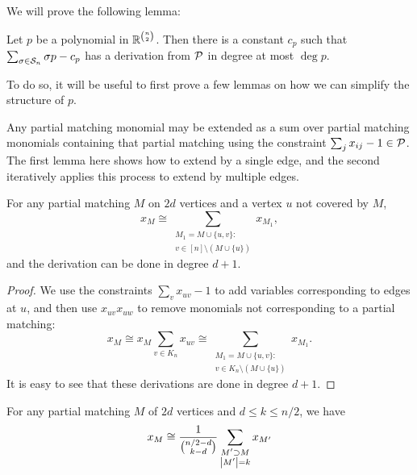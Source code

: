 We will prove the following lemma: 
\begin{lemma}
  \label{lem:constant}
  Let $p$ be a polynomial in $\mathbb R^{\binom{n}{2}}$.
	Then there is a constant $c_p$ such that $\sum_{\sigma \in \mathcal S_n} \sigma p - c_p$ has a derivation from $\mathcal P$ in degree at most $\deg p$. 
\end{lemma}
To do so, it will be useful to first prove a few lemmas on how we can simplify the structure of $p$. 

Any partial matching monomial may be extended as a sum over partial matching monomials containing that partial matching using the constraint $\sum_j x_{ij} - 1 \in \mathcal P$. The first lemma here shows how to extend by a single edge, and the second iteratively applies this process to extend by multiple edges.
\begin{lemma}
  \label{lem:matching+a}
  For any partial matching \(M\) on \(2d\) vertices
  and a vertex \(u\) not covered by \(M\),
  \begin{equation}
    \label{eq:matching+a}
    x_{M}
    \cong
    \sum_{\substack{M_{1} = M \cup \{u,v\}: \\
        v \in [n] \setminus (M \cup \{u\})}}
    x_{M_{1}}
    ,
  \end{equation}
	and the derivation can be done in degree $d+1$.
\end{lemma}
\begin{proof}
We use the constraints \(\sum_{v} x_{uv} - 1\)
to add variables corresponding to edges at \(u\),
and then use \(x_{uv} x_{uw}\) to remove monomials
not corresponding to a partial matching:
\begin{equation*}
  x_{M}
  \cong
  x_{M} \sum_{v \in K_n} x_{uv}
  \cong
  \sum_{\substack{M_{1} = M \cup \{u,v\}: \\
      v \in K_{n} \setminus (M \cup \{u\})}}
  x_{M_{1}}
  .
\end{equation*}
It is easy to see that these derivations are done in degree $d+1$.
\end{proof}
\begin{lemma}
  \label{lem:partial-matching}
  For any partial matching \(M\) of \(2d\) vertices
  and \(d \leq k \leq n/2\),
  we have
  \begin{equation}
    \label{eq:partial-matching}
    x_{M} \cong
    \frac{1}{\binom{n/2 - d}{k - d}}
    \sum_{\substack{M' \supset M \\ \left|M'\right| = k}} x_{M'}
  \end{equation}
\end{lemma}

